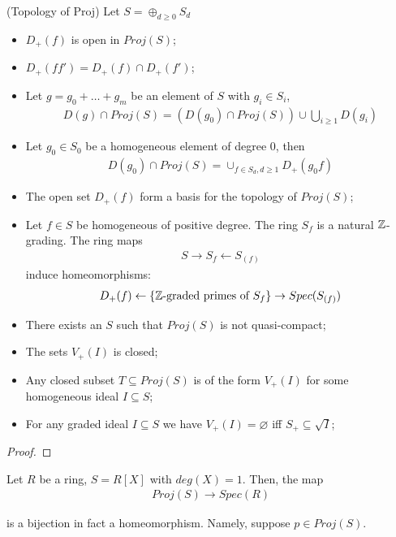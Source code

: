 \documentclass[Total.tex]{subfiles}
\begin{document}
			\begin{lemma}
				(Topology of Proj) Let $S=\oplus_{d\geq 0}S_d$
				\begin{itemize}
					\item $D_+(f)$ is open in $Proj(S)$;
					\item $D_+(ff')=D_+(f)\cap D_+(f')$;
					\item Let $g=g_0+\dots+g_m$ be an element of $S$ with $g_i\in S_i$,
					\begin{gather*}
						D(g)\cap Proj(S)=(D(g_0)\cap Proj(S))\cup \bigcup_{i\geq 1} D(g_i)
					\end{gather*}
					\item Let $g_0\in S_0$ be a homogeneous element of degree $0$, then 
					\begin{gather*}
						D(g_0)\cap Proj(S)=\cup_{f\in S_d,d\geq 1} D_+(g_0f)
					\end{gather*}
					\item The open set $D_+(f)$ form a basis for the topology of $Proj(S)$;
					\item Let $f\in S$ be homogeneous of positive degree. The ring $S_f$ is a natural $\mathbb{Z}$-grading. The ring maps
					\begin{gather*}
						S\rightarrow S_f\leftarrow S_{(f)}
					\end{gather*}
					induce homeomorphisms:
					\begin{gather*}
						D_+(f)\leftarrow \{\mathbb{Z}\mbox{-graded primes of }S_f\}\rightarrow Spec(S_{(f)})
					\end{gather*}
					\item There exists an $S$ such that $Proj(S)$ is not quasi-compact;
					\item The sets $V_+(I)$ is closed;
					\item Any closed subset $T\subseteq Proj(S)$ is of the form $V_+(I)$ for some homogeneous ideal $I\subseteq S$;
					\item For any graded ideal $I\subseteq S$ we have $V_+(I)=\varnothing$ iff $S_+\subseteq \sqrt{I}$;
				\end{itemize}
			\end{lemma}
			\begin{proof}
			\end{proof}
			
			\begin{example}
				Let $R$ be a ring, $S=R[X]$ with $deg(X)=1$. Then, the map
				\begin{gather*}
					Proj(S)\rightarrow Spec(R)
				\end{gather*}
				
				is a bijection in fact a homeomorphism. Namely, suppose $p\in Proj(S)$. 
			\end{example}
			
\end{document}
